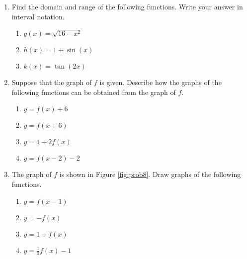 \begin{enumerate}
\item Find the domain and range of the following functions. Write your answer in interval notation.
\begin{enumerate}


\item \(g(x) = \sqrt{16-x^2}\)

\item \(h(x) = 1+ \sin(x)\)

\item \(k(x) = \tan(2x)\)


\end{enumerate}

\item Suppose that the graph of \(f\) is given. Describe how the graphs of the following functions can be obtained from the graph of \(f\).
\begin{enumerate}

\item \(y = f(x)+6\)
\item \(y=f(x+6)\)
\item \(y = 1+2f(x)\)
\item \(y = f(x-2)-2\)

\end{enumerate}

\item The graph of \(f\) is shown in Figure \ref{fig:prob8}. Draw graphs of the following functions.\label{prob8}
\begin{enumerate}

\item \(y=f(x-1)\)
\item \(y = -f(x)\)
\item \(y = 1+f(x)\)
\item \(y = \frac{1}{2}f(x)-1\)

\end{enumerate}


\begin{figure}[!h]
\centering
{}
\end{figure}
\end{enumerate}

